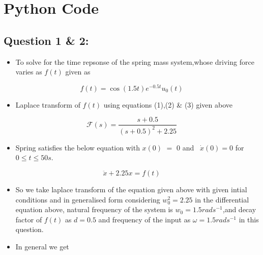 \documentclass[11pt, a4paper]{article}
\begin{document}
\section{Python Code}\label{code}

\subsection{Question 1 \& 2:}\label{question-1-2}

\begin{itemize}

\item
  To solve for the time repsonse of the spring mass system,whose driving
  force varies as \(f(t)\) given as
\end{itemize}

\begin{equation}
f(t) = \cos(1.5t) e^{-0.5t}u_0(t)
\end{equation}

\begin{itemize}

\item
  Laplace transform of \(f(t)\) using equations (1),(2) \& (3) given
  above
\end{itemize}

\begin{equation}
    \mathcal{F}(s) = \frac{s+0.5}{(s+0.5)^2 + 2.25}
\end{equation}

\begin{itemize}

\item
  Spring satisfies the below equation with \(x(0)\) \(=\) \(0\) and
  \ $\dot x(0) = 0$ for  $ 0 \leq t \leq 50s $.
\end{itemize}

\begin{equation}
\ddot x + 2.25x = f(t)
\end{equation}

\begin{itemize}
\item
  So we take laplace transform of the equation given above with given
  intial conditions and in generalised form considering
  $w_{0}^{2} = 2.25 $ in the differential equation above,
  natural frequency of the system is \(w_0 = 1.5 rads^{-1}\),and decay
  factor of \(f(t)\) as \(d = 0.5\) and frequency of the input as
  $\omega = 1.5 rads^{-1}$ in this question.
\item
  In general we get
\end{itemize}
\end{document}
